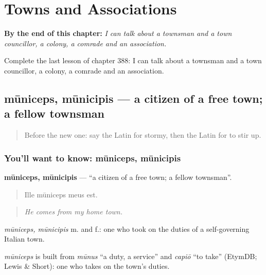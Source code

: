 
\chapter{Towns and Associations}
\label{ch:la-towns-and-associations}

\begin{chapteropening}
\textbf{By the end of this chapter:} \emph{I can talk about a townsman and a town councillor, a colony, a comrade and an association.}

Complete the last lesson of chapter 388: I can talk about a townsman and a town councillor, a colony, a comrade and an association.
\end{chapteropening}

\section[mūniceps, mūnicipis]{mūniceps, mūnicipis — a citizen of a free town; a fellow townsman}

\label{lesson:LA-C388-municeps}



\begin{quote}
Before the new one: say the Latin for stormy, then the Latin for to stir up.
\end{quote}

\subsection*{You'll want to know: mūniceps, mūnicipis}
\textbf{mūniceps, mūnicipis} — \textquotedblleft{}a citizen of a free town; a fellow townsman\textquotedblright{}.

\begin{quote}
Ille mūniceps meus est.
\end{quote}

\begin{quote}
\emph{He comes from my home town.}
\end{quote}

\emph{mūniceps, mūnicipis} m. and f.: one who took on the duties of a self-governing Italian town.

\begin{cousinweb}
\emph{mūniceps} is built from \emph{mūnus} \textquotedblleft{}a duty, a service\textquotedblright{} and \emph{capiō} \textquotedblleft{}to take\textquotedblright{} (EtymDB; Lewis \& Short): one who takes on the town's duties.
\end{cousinweb}

